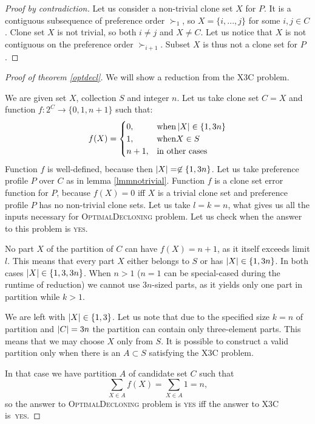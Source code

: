 \begin{proof}[Proof by contradiction]
Let us consider a non-trivial clone set $X$ for $P$.
It is a contiguous subsequence of preference order $\succ_1$, so $X = \{i,...,j\}$ for some $i,j \in C$.
Clone set $X$ is not trivial, so both $i\neq{j}$ and $X\neq{C}$.
Let us notice that $X$ is not contiguous on the preference order $\succ_{i+1}$.
Subset $X$ is thus not a clone set for $P$.
\end{proof}

\begin{proof}[Proof of theorem \ref{optdecl}]
We will show a reduction from the \textsc{X3C} problem.

We are given set $X$, collection $S$ and integer $n$.
Let us take clone set $C = X$ and function $f:2^C\rightarrow \{0,1,n+1\}$ such that:
$$ f(X) =
\begin{cases}
0, &\text{when} \left\vert X \right\vert \in \{1,3n\} \\
1, &\text{when} X \in S \\
n+1, &\text{in other cases}
\end{cases}
$$
Function $f$ is well-defined, because then $\left\vert X \right\vert = \not\in \{1,3n\}$.
Let us take preference profile $P$ over $C$ as in lemma \ref{lmmnotrivial}.
Function $f$ is a clone set error function for $P$, because $f(X) = 0$ iff $X$ is a trivial clone set
and preference profile $P$ has no non-trivial clone sets.
Let us take $l=k=n$, what gives us all the inputs necessary for \textsc{OptimalDecloning} problem.
Let us check when the answer to this problem is \textsc{yes}.

No part $X$ of the partition of $C$ can have $f(X)=n+1$, as it itself exceeds limit $l$.
This means that every part $X$ either belongs to $S$ or has $\left\vert X \right\vert \in \{1,3n\}$.
In both cases $\left\vert X \right\vert \in \{1,3,3n\}$.
When $n>1$ ($n=1$ can be special-cased during the runtime of reduction) we cannot use $3n$-sized parts,
as it yields only one part in partition while $k>1$.

We are left with $\left\vert X \right\vert \in \{1,3\}$.
Let us note that due to the specified size $k=n$ of partition and $\left\vert C \right\vert = 3n$
the partition can contain only three-element parts.
This means that we may choose $X$ only from $S$.
It is possible to construct a valid partition only when there is an $A \subset S$ satisfying the \textsc{X3C} problem.

In that case we have partition $A$ of candidate set $C$ such that
$$ \sum_{X \in A} f(X) = \sum_{X \in A} 1 = n,$$
so the answer to \textsc{OptimalDecloning} problem is \textsc{yes}
iff the answer to \textsc{X3C} is~\textsc{yes}.
\end{proof}



